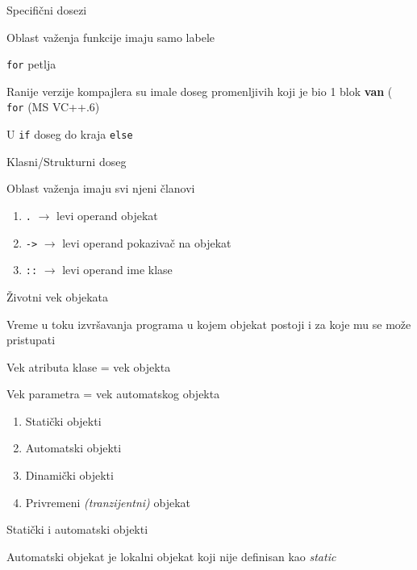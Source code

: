 \documentclass{article}
\newenvironment{xitemize}{%
    
    \itemize
    \larger
}{%
    \enditemize
}
\let\olditemize\itemize
\let\endolditemize\enditemize
\renewenvironment{itemize}{%
    \smaller
    \olditemize
}{%
    \endolditemize
}
\providecommand{\inlinecode}[1]{\texttt{#1}}
\begin{document}
\begin{xitemize}
    \item Specifični dosezi
    \begin{itemize}
        \item Oblast važenja funkcije imaju samo labele
        \item  \inlinecode{for} petlja
        \item Ranije verzije kompajlera su imale doseg promenljivih koji je bio 1 blok \textbf{van} (  \inlinecode{for} (MS VC++.6)
        \item U  \inlinecode{if} doseg do kraja  \inlinecode{else}
    \end{itemize}
    \item Klasni/Strukturni doseg
    \begin{itemize}
        \item Oblast važenja imaju svi njeni članovi
        \begin{enumerate}
            \item  \inlinecode{.} $\rightarrow$ levi operand objekat
            \item   \inlinecode{->} $\rightarrow$ levi operand pokazivač na objekat
            \item  \inlinecode{::} $\rightarrow $ levi operand ime klase
        \end{enumerate}
    \end{itemize}
    \item Životni vek objekata
    \begin{itemize}
        \item Vreme u toku izvršavanja programa u kojem objekat postoji i za koje mu se može pristupati
        \item Vek atributa klase = vek objekta
        \item Vek parametra = vek automatskog objekta
        \begin{enumerate}
            \item Statički objekti
            \item Automatski objekti
            \item Dinamički objekti
            \item Privremeni \textit{(tranzijentni)} objekat
        \end{enumerate}
    \end{itemize}
    \item Statički i automatski objekti
    \begin{itemize}
        \item Automatski objekat je lokalni objekat koji nije definisan kao \textit{static}

\end{itemize}
\end{xitemize}
\end{document}
